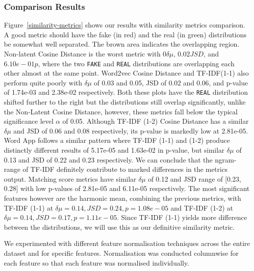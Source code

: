 \documentclass{article}
\begin{document}
\subsubsection{Comparison Results}
Figure~\ref{similarity-metrics} shows our results with similarity metrics comparison. A good metric should have the fake (in red) and the real (in green) distributions be somewhat well separated. The brown area indicates the overlapping region. Non-latent Cosine Distance is the worst metric with $0 \delta \mu$, $0.02 JSD$, and $6.10e-01 p$, where the two \texttt{FAKE} and \texttt{REAL} distributions are overlapping each other almost at the same point. Word2vec Cosine Distance and TF-IDF(1-1) also perform quite poorly with $\delta \mu$ of 0.03 and 0.05, JSD of 0.02 and 0.06, and p-value of 1.74e-03 and 2.38e-02 respectively. Both these plots have the \texttt{REAL} distribution shifted further to the right but the distributions still overlap significantly, unlike the Non-Latent Cosine Distance, however, these metrics fall below the typical significance level $\alpha$ of 0.05. Although TF-IDF (1-2) Cosine Distance has a similar $\delta \mu$ and JSD of 0.06 and 0.08 respectively, its p-value is markedly low at 2.81e-05. Word App follows a similar pattern where TF-IDF (1-1) and (1-2) produce distinctly different results of 5.17e-05 and 1.63e-02 in p-value, but similar $\delta \mu$ of 0.13 and JSD of 0.22 and 0.23 respectively. We can conclude that the ngram-range of TF-IDF definitely contribute to marked differences in the metrics output. Matching score metrics have similar $\delta \mu$ of 0.12 and JSD range of [0.23, 0.28] with low p-values of 2.81e-05 and 6.11e-05 respectively. The most significant features however are the harmonic mean, combining the previous metrics, with TF-IDF (1-1) at $\delta \mu = 0.14, JSD = 0.24, p = 1.08e-05$ and TF-IDF (1-2) at $\delta \mu = 0.14, JSD = 0.17, p = 1.11e-05$. Since TF-IDF (1-1) yields more difference between the distributions, we will use this as our definitive similarity metric.




We experimented with different feature normalisation techniques across the entire dataset and for specific features. Normalisation was conducted columnwise for each feature so that each feature was normalised individually.
\end{document}
